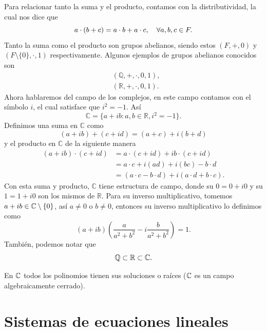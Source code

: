 \documentclass[12pt,a4paper]{book}
\begin{document}
    Para relacionar tanto la suma y el producto, contamos con la distributividad, la cual nos dice que 
    $$a \cdot (b + c) = a \cdot b + a \cdot c, \quad \forall a,b,c \in F.\vspace{20pt}$$
    Tanto la suma como el producto son grupos abelianos, siendo estos $(F, + , 0)$ y $(F\setminus \{0\},  \cdot, 1)$ respectivamente. Algunos ejemplos de grupos abelianos conocidos son 
    \begin{align*}
        &(\mathbb{Q}, + , \cdot, 0, 1),\\
        &(\mathbb{R}, + , \cdot, 0, 1).   
    \end{align*}
    Ahora hablaremos del campo de los complejos, en este campo contamos con el símbolo $i$, el cual satisface que $i^2 = -1.$ Así
    $$\mathbb{C} = \{a + ib : a,b \in \mathbb{R}, i^{2} = -1\}.$$
    Definimos una suma en $\mathbb{C}$ como
    $$(a + ib) + (c + id) = (a + c) + i(b + d)$$
    y el producto en $\mathbb{C}$ de la siguiente manera
    \begin{align*}
        (a + ib) \cdot (c + id) & = a \cdot (c + id) + ib \cdot (c + id)\\
        & = a \cdot c + i(ad) + i(bc) - b\cdot d\\
        & = (a \cdot c - b \cdot d) + i(a \cdot d + b \cdot c).
    \end{align*}
    Con esta suma y producto, $\mathbb{C}$ tiene estructura de campo, donde su $0 = 0 + i0$ y su $1 = 1+ i0$ son los mismos de $\mathbb{R}.$ 
    Para su inverso multiplicativo, tomemos $a + ib \in \mathbb{C} \setminus \{0\}$, así $a \ne 0$ o $b\ne 0$, entonces su inverso multiplicativo lo definimos como
    $$(a + ib) \left( \frac{a}{a^2 + b^2} - i \frac{b}{a^2 + b^2} \right) = 1.$$
    También, podemos notar que
    $$\mathbb{Q} \subset \mathbb{R} \subset \mathbb{C}.$$
    
    \begin{teorema}
        En $\mathbb{C}$ todos los polinomios tienen sus soluciones o raíces ($\mathbb{C}$ es un campo algebraicamente cerrado).
    \end{teorema}
    
    \section{Sistemas de ecuaciones lineales}
    
\end{document}
